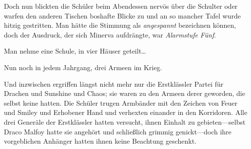 Doch nun blickten die Schüler beim Abendessen nervös über die Schulter oder warfen den anderen Tischen boshafte Blicke zu und an so mancher Tafel wurde hitzig gestritten. Man hätte die Stimmung als \emph{angespannt} bezeichnen können, doch der Ausdruck, der sich Minerva aufdrängte, war \emph{Alarmstufe} \emph{Fünf}.

Man nehme eine Schule, in vier Häuser geteilt…

Nun noch in jedem Jahrgang, drei Armeen im Krieg.

Und inzwischen ergriffen längst nicht mehr nur die Erstklässler Partei für Drachen und Sunshine und Chaos; sie waren zu den Armeen derer geworden, die selbst keine hatten. Die Schüler trugen Armbänder mit den Zeichen von Feuer und Smiley und Erhobener Hand und verhexten einander in den Korridoren. Alle drei Generäle der Erstklässler hatten versucht, ihnen Einhalt zu gebieten—selbst Draco Malfoy hatte sie angehört und schließlich grimmig genickt—doch ihre vorgeblichen Anhänger hatten ihnen keine Beachtung geschenkt.

